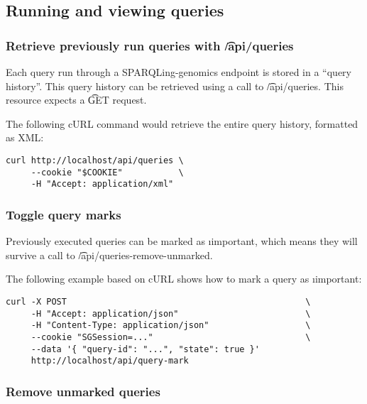 \pagebreak{}
\subsection{Running and viewing queries}

\subsubsection{Retrieve previously run queries with \t{/api/queries}}

  Each query run through a SPARQLing-genomics endpoint is stored in
  a ``query history''.  This query history can be retrieved using a
  call to \t{/api/queries}.  This resource expects a \t{GET} request.

  The following cURL command would retrieve the entire query history, formatted
  as XML:

\begin{siderules}
\begin{verbatim}
curl http://localhost/api/queries \
     --cookie "$COOKIE"           \
     -H "Accept: application/xml"
\end{verbatim}
\end{siderules}

\subsubsection{Toggle query marks}

\begin{sloppypar}
  Previously executed queries can be marked as \i{important}, which means
  they will survive a call to \t{/api/queries-remove-unmarked}.
\end{sloppypar}

  The following example based on cURL shows how to mark a query as
  \i{important}:
\begin{siderules}
\begin{verbatim}
curl -X POST                                               \
     -H "Accept: application/json"                         \
     -H "Content-Type: application/json"                   \
     --cookie "SGSession=..."                              \
     --data '{ "query-id": "...", "state": true }'
     http://localhost/api/query-mark
\end{verbatim}
\end{siderules}

\subsubsection{Remove unmarked queries}


